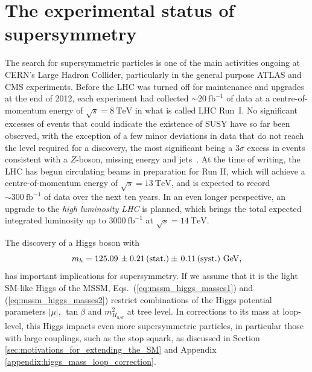 \documentclass[twoside,english]{uiofysmaster}
\begin{document}
\section{The experimental status of supersymmetry}
The search for supersymmetric particles is one of the main activities ongoing at CERN's Large Hadron Collider, particularly in the general purpose ATLAS and CMS experiments. Before the LHC was turned off for maintenance and upgrades at the end of 2012, each experiment had collected $\sim 20 ~\mathrm{fb}^{-1}$ of data at a centre-of-momentum energy of $\sqrt{s} = 8~\mathrm{TeV}$ in what is called LHC Run~I. No significant excesses of events that could indicate the existence of SUSY have so far been observed, with the exception of a few minor deviations in data that do not reach the level required for a discovery, the most significant being a $3\sigma$ excess in events consistent with a $Z$-boson, missing energy and jets~\cite{Aad:2015wqa}. At the time of writing, the LHC has begun circulating beams in preparation for Run II, which will achieve a centre-of-momentum energy of $\sqrt{s} = 13~\mathrm{TeV}$, and is expected to record $\sim 300 ~\mathrm{fb}^{-1}$ of data over the next ten years. In an even longer perspective, an upgrade to the {\it high luminosity LHC} is planned, which brings the total expected integrated luminosity up to $3000~\mathrm{fb}^{-1}$ at $\sqrt{s} = 14~\mathrm{TeV}$. 

The discovery of a Higgs boson with~\cite{Aad:2015zhl}
\begin{equation}
m_h = 125.09\,\pm 0.21\, (\rm{stat.})\pm\, 0.11\, (\rm{syst.})~{\rm GeV,}
\label{eq:higgsmass}
\end{equation}
has important implications for supersymmetry. If we assume that it is the light SM-like Higgs of the MSSM, Eqs.\ (\ref{eq:mssm_higgs_masses1}) and (\ref{eq:mssm_higgs_masses2}) restrict combinations of the Higgs potential parameters $|\mu|$, $\tan\beta$ and $m^2_{H_{u/d}}$ at tree level. In corrections to its mass at loop-level, this Higgs impacts even more supersymmetric particles, in particular those with large couplings, such as the stop squark, as discussed in Section \ref{sec:motivations_for_extending_the_SM} and Appendix \ref{appendix:higgs_mass_loop_correction}.
\end{document}
